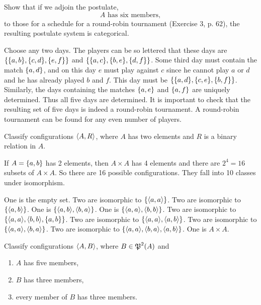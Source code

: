 \documentclass{report}
\begin{document}
\begin{exercise}
Show that if we adjoin the postulate,
\[\text{$A$ has six members},\]
to those for a schedule for a round-robin tournament (Exercise 3, p. 62), the resulting
postulate system is categorical.
\end{exercise}

\begin{solution}
Choose any two days.
The players can be so lettered that these days are $\set{\set{a, b},\set{c, d},\set{e, f}}$
and $\set{\set{a, c},\set{b, e},\set{d, f}}$.
Some third day must contain the match
$\left\{a, d\right\}$, and on this day $e$ must play against $c$ since he cannot play $a$ or $d$ and
he has already played $b$ and $f$.
This day must be $\set{\set{a,d},\set{c,e},\set{b,f}}$.
Similarly, the days containing
the matches $\left\{a, e\right\}$ and $\left\{a, f\right\}$ are uniquely determined.
Thus all five days are determined.
It is important to check that the resulting set of five days is indeed a round-robin
tournament. A round-robin tournament can be found for any even number of players.
\end{solution}

\begin{exercise}
Classify configurations $\left\langle A, R\right\rangle$, where $A$ has two elements and $R$ is a binary relation
in $A$.
\end{exercise}

\begin{solution}
If $A=\left\{a,b\right\}$ has 2 elements, then $A\times A$ has 4 elements and there are $2^4=16$ subsets
of $A\times A$. So there are 16 possible configurations. They fall into 10 classes under isomorphism.

One is the empty set.
Two are isomorphic to $\left\{\left\langle a,a\right\rangle\right\}$.
Two are isomorphic to $\left\{\left\langle a,b\right\rangle\right\}$.
One is $\set{\aprn{a,b},\aprn{b,a}}$.
One is $\set{\aprn{a,a},\aprn{b,b}}$.
Two are isomorphic to $\set{\aprn{a,a},\aprn{b,b},\set{a,b}}$.
Two are isomorphic to $\set{\aprn{a,a},\aprn{a,b}}$.
Two are isomorphic to $\set{\aprn{a,a},\aprn{b,a}}$.
Two are isomorphic to $\set{\aprn{a,a},\aprn{b,a},\aprn{a,b}}$.
One is $A\times A$.
\end{solution}

\begin{exercise}
Classify configurations $\left\langle A,B\right\rangle$, where $B \in\operatorname{\mathfrak{P}}^2(A)$ and
\begin{enumerate}[label=(\alph*)]
    \item $A$ has five members,
    \item $B$ has three members,
    \item every member of $B$ has three members.
\end{enumerate}
\end{exercise}
\end{document}
